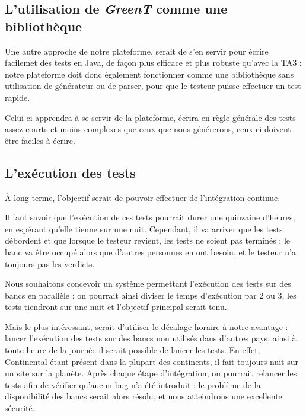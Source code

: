 	\subsection{L'utilisation de \textit{GreenT} comme une bibliothèque}
		Une autre approche de notre plateforme, serait de s'en servir pour écrire facilemet des tests en Java, de façon plus efficace et plus robuste qu'avec la TA3 : notre plateforme doit donc également fonctionner comme une bibliothèque sans utilisation de générateur ou de parser, pour que le testeur puisse effectuer un test rapide. 

		Celui-ci apprendra à se servir de la plateforme, écrira en règle générale des tests assez courts et moins complexes que ceux que nous générerons, ceux-ci doivent être faciles à écrire.

	\subsection{L'exécution des tests}
	À long terme, l'objectif serait de pouvoir effectuer de l'intégration continue. 

	Il faut savoir que l'exécution de ces tests pourrait durer une quinzaine d'heures, en espérant qu'elle tienne sur une nuit. Cependant, il va arriver que les tests débordent et que lorsque le testeur revient, les tests ne soient pas terminés : le banc va être occupé alors que d'autres personnes en ont besoin, et le testeur n'a toujours pas les verdicts.

	 Nous souhaitons concevoir un système permettant l'exécution des tests sur des bancs en parallèle : on pourrait ainsi diviser le temps d'exécution par 2 ou 3, les tests tiendront sur une nuit et l'objectif principal serait tenu.

	 Mais le plus intéressant, serait d'utiliser le décalage horaire à notre avantage : lancer l'exécution des tests sur des bancs non utilisés dans d'autres pays, ainsi à toute heure de la journée il serait possible de lancer les tests. En effet, Continental étant présent dans la plupart des continents, il fait toujours nuit sur un site sur la planète. Après chaque étape d'intégration, on pourrait relancer les tests afin de vérifier qu'aucun bug n'a été introduit : le problème de la disponibilité des bancs serait alors résolu, et nous atteindrons une excellente sécurité.

